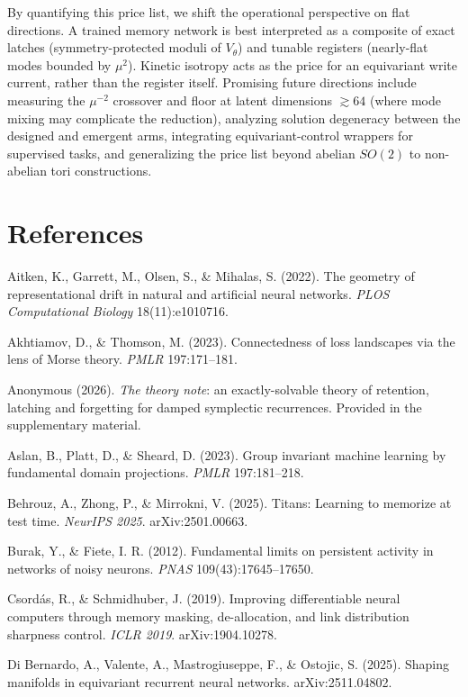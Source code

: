 \documentclass{article}
\begin{document}
By quantifying this price list, we shift the operational perspective on flat directions. A trained memory network is best interpreted as a composite of exact latches (symmetry-protected moduli of $V_\theta$) and tunable registers (nearly-flat modes bounded by $\mu^2$). Kinetic isotropy acts as the price for an equivariant write current, rather than the register itself. Promising future directions include measuring the $\mu^{-2}$ crossover and floor at latent dimensions $\gtrsim64$ (where mode mixing may complicate the reduction), analyzing solution degeneracy between the designed and emergent arms, integrating equivariant-control wrappers for supervised tasks, and generalizing the price list beyond abelian $SO(2)$ to non-abelian tori constructions.

\section*{References}
\begingroup
\setlength{\parindent}{-0.22in}\setlength{\leftskip}{0.22in}\setlength{\parskip}{\smallskipamount}

Aitken, K., Garrett, M., Olsen, S., \& Mihalas, S. (2022). The geometry of representational drift in natural and artificial neural networks. \emph{PLOS Computational Biology} 18(11):e1010716.

Akhtiamov, D., \& Thomson, M. (2023). Connectedness of loss landscapes via the lens of Morse theory. \emph{PMLR} 197:171--181.

Anonymous (2026). \emph{The theory note}: an exactly-solvable theory of retention, latching and forgetting for damped symplectic recurrences. Provided in the supplementary material.

Aslan, B., Platt, D., \& Sheard, D. (2023). Group invariant machine learning by fundamental domain projections. \emph{PMLR} 197:181--218.

Behrouz, A., Zhong, P., \& Mirrokni, V. (2025). Titans: Learning to memorize at test time. \emph{NeurIPS 2025}. arXiv:2501.00663.

Burak, Y., \& Fiete, I. R. (2012). Fundamental limits on persistent activity in networks of noisy neurons. \emph{PNAS} 109(43):17645--17650.

Csord\'as, R., \& Schmidhuber, J. (2019). Improving differentiable neural computers through memory masking, de-allocation, and link distribution sharpness control. \emph{ICLR 2019}. arXiv:1904.10278.

Di Bernardo, A., Valente, A., Mastrogiuseppe, F., \& Ostojic, S. (2025). Shaping manifolds in equivariant recurrent neural networks. arXiv:2511.04802.
\end{document}
